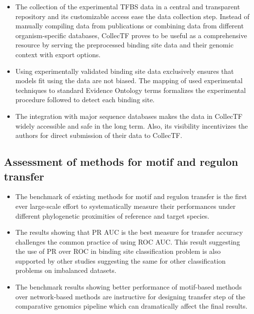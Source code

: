\begin{itemize}
\item The collection of the experimental TFBS data in a central and transparent
  repository and its customizable access ease the data collection step. Instead
  of manually compiling data from publications or combining data from different
  organism-specific databases, CollecTF proves to be useful as a comprehensive
  resource  by serving the preprocessed binding site data and their
  genomic context with export options.

\item Using experimentally validated binding site data exclusively ensures that
  models fit using the data are not biased. The mapping of used experimental
  techniques to standard Evidence Ontology terms formalizes the experimental
  procedure followed to detect each binding site.

\item The integration with major sequence databases makes the data in CollecTF
  widely accessible and safe in the long term. Also, its visibility
  incentivizes the authors for direct submission of their data to CollecTF.
\end{itemize}

\subsection{Assessment of methods for motif and regulon transfer}

\begin{itemize}
\item The benchmark of existing methods for motif and regulon transfer is the
  first ever large-scale effort to systematically measure their performances
  under different phylogenetic proximities of reference and target species.

\item The results showing that PR AUC is the best measure for transfer accuracy
  challenges the common practice of using ROC AUC\@. This result suggesting the
  use of PR over ROC in binding site classification problem is also supported
  by other studies suggesting the same for other classification problems on
  imbalanced datasets.

\item The benchmark results showing better performance of motif-based methods
  over network-based methods are instructive for designing transfer step of the
  comparative genomics pipeline which can dramatically affect the final results.
\end{itemize}

